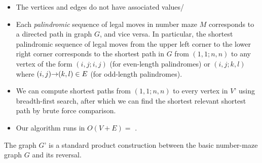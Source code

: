 \documentclass[11pt]{article}
\begin{document}
\begin{enumerate}
\begin{Solution}
\begin{itemize}
\item
The vertices and edges do not have associated values/

\item
Each \emph{palindromic} sequence of legal moves in number maze $M$ corresponds to a directed path in graph $G$, and vice versa.  In particular, the shortest palindromic sequence of legal moves from the upper left corner to the lower right corner corresponds to the shortest path in $G$ from $(1,1;n,n)$ to any vertex of the form $(i,j;i,j)$ (for even-length palindromes) or $(i,j;k,l)$ where $(i,j)\mathord{\rightarrow}(k,l)\in E$ (for odd-length palindromes).

\item
We can compute shortest paths from $(1,1;n,n)$ to every vertex in $V’$ using breadth-first search, after which we can find the shortest relevant shortest path by brute force comparison.

\item
Our algorithm runs in $O(V+E) =$ .

\end{itemize}
The graph $G’$ is a standard product construction between the basic number-maze graph $G$ and its reversal.
\end{Solution}
\end{enumerate}




\end{document}

